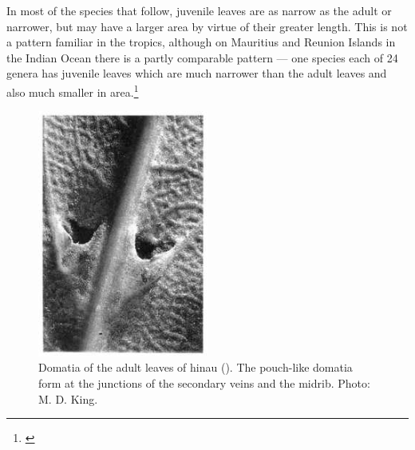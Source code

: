 In most of the species that follow, juvenile leaves are as narrow as the adult or narrower, but may have a larger area by virtue of their greater length.
This is not a pattern familiar in the tropics, although on Mauritius and Reunion Islands in the Indian Ocean there is a partly comparable pattern --- one species each of 24 genera has juvenile leaves which are much narrower than the adult leaves and also much smaller in area.\footnote{\cite{friedmann1976observations}}

\begin{figure}
	\includegraphics[width=0.5\textwidth]{graphics/figure23hinau.jpg}
	\centering
	\caption[Domatia of the adult leaves of hinau]{Domatia of the adult leaves of hinau ().
The pouch-like domatia form at the junctions of the secondary veins and the midrib.
	Photo: M. D. King.}%
	\label{fig:23hinau}
\end{figure}

